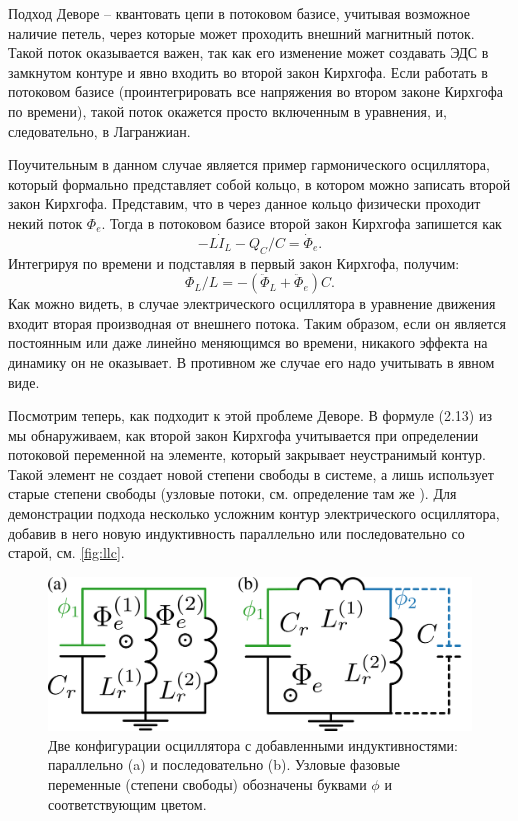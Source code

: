 \documentclass[14pt, a4paper]{extreport}
\numberwithin{equation}{section}
\begin{document}
Подход Деворе -- квантовать цепи в потоковом базисе, учитывая возможное наличие петель, через которые может проходить внешний магнитный поток. Такой поток оказывается важен, так как его изменение может создавать ЭДС в замкнутом контуре и явно входить во второй закон Кирхгофа. Если работать в потоковом базисе (проинтегрировать все напряжения во втором законе Кирхгофа по времени), такой поток окажется просто включенным в уравнения, и, следовательно, в Лагранжиан. 

Поучительным в данном случае является пример гармонического осциллятора, который формально представляет собой кольцо, в котором можно записать второй закон Кирхгофа. Представим, что в через данное кольцо физически проходит некий поток $\Phi_e$. Тогда в потоковом базисе второй закон Кирхгофа запишется как
\begin{equation}
	-L\dot I_L - Q_C/C = \dot \Phi_e.
\end{equation}
Интегрируя по времени и подставляя в первый закон Кирхгофа, получим:
\begin{equation}
	\Phi_L/L = - (\ddot \Phi_L + \ddot \Phi_e)C.
\end{equation}
Как можно видеть, в случае электрического осциллятора в уравнение движения входит вторая производная от внешнего потока. Таким образом, если он является постоянным или даже линейно меняющимся во времени, никакого эффекта на динамику он не оказывает. В противном же случае его надо учитывать в явном виде.

Посмотрим теперь, как подходит к этой проблеме Деворе. В формуле (2.13) из \cite{devoret1995quantum} мы обнаруживаем, как второй закон Кирхгофа учитывается при определении потоковой переменной на элементе, который закрывает неустранимый контур. Такой элемент не создает новой степени свободы в системе, а лишь использует старые степени свободы (узловые потоки, см. определение там же \cite{devoret1995quantum}). Для демонстрации подхода несколько усложним контур электрического осциллятора, добавив в него новую индуктивность параллельно или последовательно со старой, см. \autoref{fig:llc}.
\begin{figure}
	\centering
	\includegraphics[width=0.8\linewidth]{Pictures/LLC}
	\caption{Две конфигурации осциллятора с добавленными индуктивностями: параллельно (a) и последовательно (b). Узловые фазовые переменные (степени свободы) обозначены буквами $\phi$ и соответствующим цветом.}
	\label{fig:llc}
\end{figure}
\end{document}
